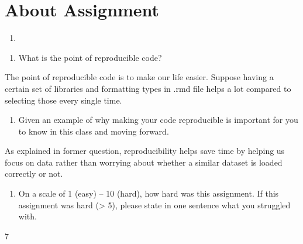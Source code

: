 \documentclass[
]{article}
\providecommand{\tightlist}{%
  \setlength{\itemsep}{0pt}\setlength{\parskip}{0pt}}
\begin{document}
\hypertarget{about-assignment}{%
\section{About Assignment}\label{about-assignment}}

\begin{enumerate}
\def\labelenumi{\arabic{enumi}.}
\setcounter{enumi}{5}
\tightlist
\item
\end{enumerate}

\begin{enumerate}
\def\labelenumi{\alph{enumi}.}
\tightlist
\item
  What is the point of reproducible code?
\end{enumerate}

The point of reproducible code is to make our life easier. Suppose
having a certain set of libraries and formatting types in .rmd file
helps a lot compared to selecting those every single time.

\begin{enumerate}
\def\labelenumi{\alph{enumi}.}
\setcounter{enumi}{1}
\tightlist
\item
  Given an example of why making your code reproducible is important for
  you to know in this class and moving forward.
\end{enumerate}

As explained in former question, reproducibility helps save time by
helping us focus on data rather than worrying about whether a similar
dataset is loaded correctly or not.

\begin{enumerate}
\def\labelenumi{\alph{enumi}.}
\setcounter{enumi}{2}
\tightlist
\item
  On a scale of 1 (easy) -- 10 (hard), how hard was this assignment. If
  this assignment was hard (\textgreater{} 5), please state in one
  sentence what you struggled with.
\end{enumerate}

7
\end{document}
